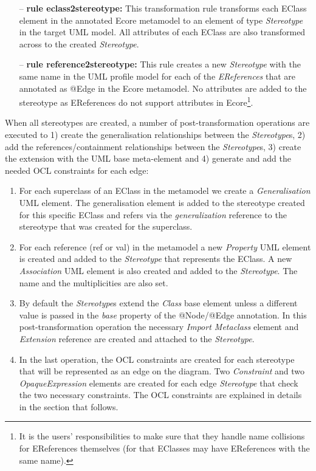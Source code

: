 \begin{itemize}
	\item[--] \textbf{rule eclass2stereotype:} This transformation rule transforms each EClass element in the annotated Ecore metamodel to an element of type \textit{Stereotype} in the target UML model. 
	All attributes of each EClass are also transformed across to the created \textit{Stereotype}. 
	\item[--] \textbf{rule reference2stereotype:} This rule creates a new \textit{Stereotype} with the same name in the UML profile model for each of the \textit{EReferences} that are annotated as @Edge in the Ecore metamodel. 
	No attributes are added to the stereotype as EReferences do not support attributes in Ecore\footnote{It is the users' responsibilities to make sure that they handle name collisions for EReferences themselves (for that EClasses may have EReferences with the same name).}.
\end{itemize}

When all stereotypes are created, a number of post-transformation operations are executed to 1) create the generalisation relationships between the \textit{Stereotype}s, 2) add the references/containment relationships between the \textit{Stereotype}s, 3) create the extension with the UML base meta-element and 4) generate and add the needed OCL constraints for each edge: 

\begin{enumerate}[label=\arabic*)]
	\item For each superclass of an EClass in the metamodel we create a \textit{Generalisation} UML element. 
	The generalisation element is added to the stereotype created for this specific EClass and refers via the \textit{generalization} reference to the stereotype that was created for the superclass.
	\item For each reference (ref or val) in the metamodel a new \textit{Property} UML element is created and added to the \textit{Stereotype} that represents the EClass. 
	A new \textit{Association} UML element is also created and added to the \textit{Stereotype}. The name and the multiplicities are also set.
	\item By default the \textit{Stereotype}s extend the \textit{Class} base element unless a different value is passed in the \textit{base} property of the @Node/@Edge annotation. 
	In this post-transformation operation the necessary \textit{Import Metaclass} element and \textit{Extension} reference are created and attached to the \textit{Stereotype}.
	\item In the last operation, the OCL constraints are created for each stereotype that will be represented as an edge on the diagram. 
	Two \textit{Constraint} and two \textit{OpaqueExpression} elements are created for each edge \textit{Stereotype} that check the two necessary constraints. 
	The OCL constraints are explained in details in the section that follows.
\end{enumerate}

